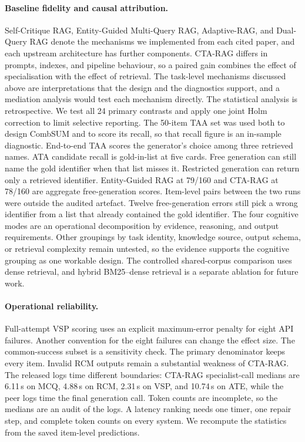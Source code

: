 \documentclass[5p,times,authoryear]{elsarticle}
\begin{document}
\paragraph{Baseline fidelity and causal attribution.}
Self-Critique RAG, Entity-Guided Multi-Query RAG, Adaptive-RAG, and
Dual-Query RAG denote the mechanisms we implemented from each cited paper,
and each upstream architecture has further components. CTA-RAG differs in
prompts, indexes, and pipeline behaviour, so a paired gain combines the
effect of specialisation with the effect of retrieval. The task-level
mechanisms discussed above are interpretations that the design and the
diagnostics support, and a mediation analysis would test each mechanism
directly. The statistical analysis is retrospective. We test all 24 primary
contrasts and apply one joint Holm correction to limit selective reporting.
The 50-item TAA set was used both to design CombSUM and to score its recall, so that recall figure is an in-sample diagnostic. End-to-end TAA scores the generator's choice among three retrieved names. ATA candidate recall is gold-in-list at five cards. Free generation can still name the gold identifier when that list misses it. Restricted generation can return only a retrieved identifier. Entity-Guided RAG at 79/160 and CTA-RAG at 78/160 are aggregate free-generation scores. Item-level pairs between the two runs were outside the audited artefact. Twelve free-generation errors still pick a wrong identifier from a list that already contained the gold identifier.
The four cognitive modes are an operational decomposition by evidence,
reasoning, and output requirements. Other groupings by task identity,
knowledge source, output schema, or retrieval complexity remain untested, so
the evidence supports the cognitive grouping as one workable design. The
controlled shared-corpus comparison uses dense retrieval, and hybrid
BM25--dense retrieval is a separate ablation for future work.

\paragraph{Operational reliability.}
Full-attempt VSP scoring uses an explicit maximum-error penalty for eight
API failures. Another convention for the eight failures can change the effect size.
The common-success subset is a sensitivity check. The primary denominator keeps every item. Invalid RCM outputs remain a substantial weakness
of CTA-RAG. The released logs time different boundaries: CTA-RAG specialist-call medians are 6.11\,s on MCQ, 4.88\,s on RCM, 2.31\,s on VSP, and 10.74\,s on ATE, while the peer logs time the final generation call. Token counts are incomplete, so the medians are an audit of the logs. A latency ranking needs one timer, one repair step, and complete token counts on every system. We recompute the statistics from the saved item-level predictions.
\end{document}
